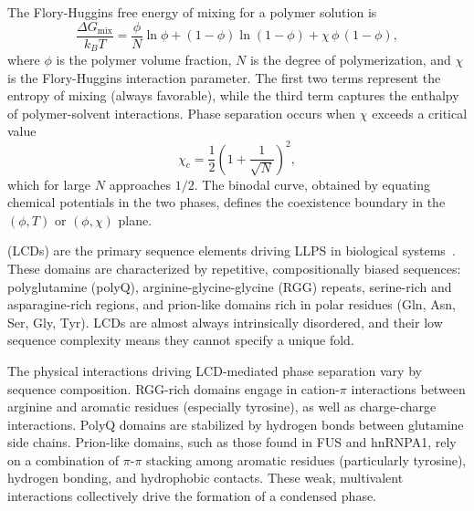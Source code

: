 The Flory-Huggins free energy of mixing for a polymer solution is
%
\begin{equation}
  \frac{\Delta G_{\text{mix}}}{k_B T}
    = \frac{\phi}{N} \ln \phi
    + (1 - \phi) \ln(1 - \phi)
    + \chi \, \phi \, (1 - \phi),
  \label{eq:flory-huggins}
\end{equation}
%
\noindent where $\phi$ is the polymer volume fraction, $N$ is the degree of polymerization,
and $\chi$ is the Flory-Huggins interaction parameter.  The first two terms represent the
entropy of mixing (always favorable), while the third term captures the enthalpy of
polymer-solvent interactions.  Phase separation occurs when $\chi$ exceeds a critical value
%
\begin{equation}
  \chi_c = \frac{1}{2}\left(1 + \frac{1}{\sqrt{N}}\right)^{\!2},
  \label{eq:chi-critical}
\end{equation}
%
\noindent which for large $N$ approaches $1/2$.  The binodal curve, obtained by equating
chemical potentials in the two phases, defines the coexistence boundary in the $(\phi, T)$
or $(\phi, \chi)$ plane.

 (LCDs) are the primary sequence elements driving LLPS in
biological systems~\cite{banani2017}.  These domains are characterized by repetitive,
compositionally biased sequences: polyglutamine (polyQ), arginine-glycine-glycine (RGG)
repeats, serine-rich and asparagine-rich regions, and prion-like domains rich in polar
residues (Gln, Asn, Ser, Gly, Tyr).  LCDs are almost always intrinsically disordered, and
their low sequence complexity means they cannot specify a unique fold.

The physical interactions driving LCD-mediated phase separation vary by sequence composition.
RGG-rich domains engage in cation-$\pi$ interactions between arginine and aromatic residues
(especially tyrosine), as well as charge-charge interactions.  PolyQ domains are stabilized
by hydrogen bonds between glutamine side chains.  Prion-like domains, such as those found in
FUS and hnRNPA1, rely on a combination of $\pi$-$\pi$ stacking among aromatic residues
(particularly tyrosine), hydrogen bonding, and hydrophobic contacts.  These weak, multivalent
interactions collectively drive the formation of a condensed phase.


